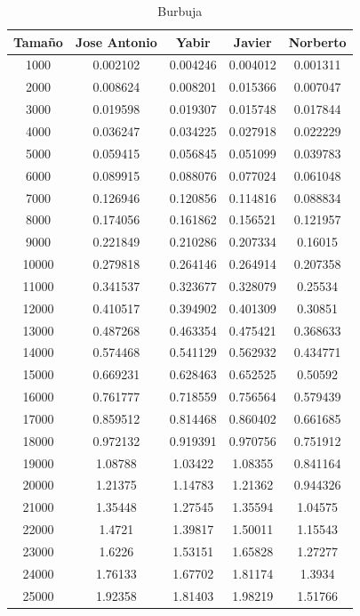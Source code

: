 \documentclass[11pt,a4paper]{article}
\begin{document}
\begin{table}[h]
	\centering
	\caption{Burbuja}
	\begin{tabular}{ | c | c  | c | c | c | }
		\hline
		Tama\~no & Jose Antonio & Yabir & Javier & Norberto\\ 
		\hline
		1000	&	0.002102	&	0.004246	&	0.004012	&	0.001311	\\
		2000	&	0.008624	&	0.008201	&	0.015366	&	0.007047	\\
		3000	&	0.019598	&	0.019307	&	0.015748	&	0.017844	\\
		4000	&	0.036247	&	0.034225	&	0.027918	&	0.022229	\\
		5000	&	0.059415	&	0.056845	&	0.051099	&	0.039783	\\
		6000	&	0.089915	&	0.088076	&	0.077024	&	0.061048	\\
		7000	&	0.126946	&	0.120856	&	0.114816	&	0.088834	\\
		8000	&	0.174056	&	0.161862	&	0.156521	&	0.121957	\\
		9000	&	0.221849	&	0.210286	&	0.207334	&	0.16015	\\
		10000	&	0.279818	&	0.264146	&	0.264914	&	0.207358	\\
		11000	&	0.341537	&	0.323677	&	0.328079	&	0.25534	\\
		12000	&	0.410517	&	0.394902	&	0.401309	&	0.30851	\\
		13000	&	0.487268	&	0.463354	&	0.475421	&	0.368633	\\
		14000	&	0.574468	&	0.541129	&	0.562932	&	0.434771	\\
		15000	&	0.669231	&	0.628463	&	0.652525	&	0.50592	\\
		16000	&	0.761777	&	0.718559	&	0.756564	&	0.579439	\\
		17000	&	0.859512	&	0.814468	&	0.860402	&	0.661685	\\
		18000	&	0.972132	&	0.919391	&	0.970756	&	0.751912	\\
		19000	&	1.08788	&	1.03422	&	1.08355	&	0.841164	\\
		20000	&	1.21375	&	1.14783	&	1.21362	&	0.944326	\\
		21000	&	1.35448	&	1.27545	&	1.35594	&	1.04575	\\
		22000	&	1.4721	&	1.39817	&	1.50011	&	1.15543	\\
		23000	&	1.6226	&	1.53151	&	1.65828	&	1.27277	\\
		24000	&	1.76133	&	1.67702	&	1.81174	&	1.3934	\\
		25000	&	1.92358	&	1.81403	&	1.98219	&	1.51766	\\
		\hline
	\end{tabular}
\end{table}
\end{document}
